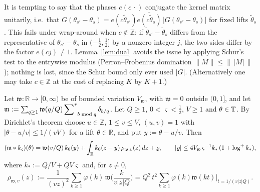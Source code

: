 \begin{remark}\label{rem:phase}
It is tempting to say that the phases $e(c\,\cdot)$ conjugate the kernel matrix unitarily, i.e.\ that
$G(\theta_{s'}-\theta_s)=e(c\tilde\theta_{s'})\overline{e(c\tilde\theta_s)}\,|G(\theta_{s'}-\theta_s)|$ for fixed lifts $\tilde\theta_s$. This
fails under wrap-around when $c\notin\mathbb Z$: if $\tilde\theta_{s'}-\tilde\theta_s$ differs from the representative of
$\theta_{s'}-\theta_s$ in $(-\frac12,\frac12]$ by a nonzero integer $j$, the two sides differ by the factor $e(cj)\ne1$. Lemma~\ref{lem:dual} avoids the issue by applying Schur's test to the entrywise modulus
(Perron--Frobenius domination $\|M\|\le\|\,|M|\,\|$); nothing is lost, since the Schur bound only ever used $|G|$.
(Alternatively one may take $c\in\mathbb Z$ at the cost of replacing $K$ by $K+1$.)
\end{remark}

\begin{proposition}\label{prop:count}
Let $\mathfrak w:\mathbb R\to[0,\infty)$ be of bounded variation $V_{\mathfrak w}$, with $\mathfrak w=0$ outside $(0,1]$,
and let $\mathfrak m:=\sum_{q\ge1}\mathfrak w(q/Q)\sideset{}{^*}\sum_{b\bmod q}\delta_{b/q}$. Let $Q\ge1$, $0<\varsigma<\frac12$, $V\ge1$ and
$\theta\in\mathbb{T}$. By Dirichlet's theorem choose $u\in\mathbb Z$, $1\le v\le V$, $(u,v)=1$ with $|\theta-u/v|\le1/(vV)$
for a lift $\theta\in\mathbb R$, and put $y:=\theta-u/v$. Then
\begin{equation}\label{eqA:count}
 (\mathfrak m*k_{\varsigma})(\theta)=\mathfrak w(v/Q)\,k_0(y)+\int_{\mathbb R}k_0(z-y)\,\rho_{\mathfrak w,v}(z)\,dz+\varrho,
 \qquad |\varrho|\le 4V_{\mathfrak w}\,\varsigma^{-1}k_*\,(1+\log^+k_*),
\end{equation}
where $k_*:=Q/V+QV\varsigma$ and, for $z\ne0$,
\begin{equation}\label{eqA:rho}
 \rho_{\mathfrak w,v}(z):=\frac1{(vz)^2}\sum_{k\ge1}\varphi(k)\,\mathfrak w\Big(\frac{k}{v|z|Q}\Big)
 =Q^2\,t^2\sum_{k\ge1}\varphi(k)\mathfrak w(kt)\Big|_{t=1/(v|z|Q)}.
\end{equation}
\end{proposition}

